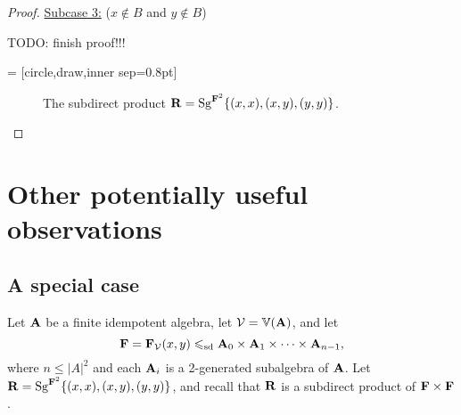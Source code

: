 \begin{proof}
\noindent \underline{Subcase 3:} ($x\notin B$ and $y\notin B$)\\[5pt]
\vskip1cm

\noindent TODO: finish proof!!!

   = [circle,draw,inner sep=0.8pt]
  \begin{center}
  \begin{figure}
    \caption{The subdirect product $\mathbf R = \operatorname{Sg}^{\mathbf{F}^2}\{(x,x), (x,y), (y,y)\}$.}
  \end{figure}
  \end{center}
\bigskip


\vfill

\end{proof}
\newpage


\section{Other potentially useful observations}

\renewcommand\bx{\ensuremath{x}}
\renewcommand\by{\ensuremath{y}}
\subsection{A special case}
Let $\mathbf{A}$ be a finite idempotent algebra, let $\mathcal{V} = \operatorname{\mathbb{V}}(\mathbf{A})$, and let
\[\bF= \bF_{\sV}(\bx,\by) \sdp \bA_0 \times \bA_1 \times \cdots \times \bA_{n-1},\]
where $n \leq |A|^2$ and each $\mathbf{A}_i$ is a 2-generated subalgebra of $\mathbf{A}$.
Let $\bR = \Sg^{\bF^2} \{(\bx, \bx), (\bx, \by), (\by, \by)\}$,
and recall that $\mathbf{R}$ is a subdirect product of $\mathbf{F} \times \mathbf{F}$.

